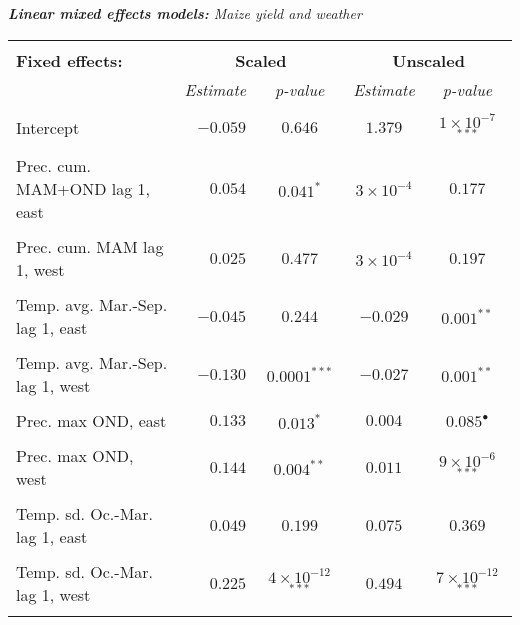 \documentclass[a4paper,12pt]{article}
\begin{document}
{\centering
\begin{threeparttable}


\singlespacing
\caption{\textit{\textbf{Linear mixed effects models:} Maize yield and weather}}
\label{Peggy45} 
\centering
\begin{small}
\begin{tabular}{lrccc} 
\hline \vspace{-0.2cm} \\
  
  
  \multicolumn{1}{l}{\vspace{0.1cm}\textbf{Fixed effects:}}  &\multicolumn{2}{c}{\textbf{Scaled}}& \multicolumn{2}{c}{{\textbf{Unscaled\tnote{a}}}} \\
  
    \multicolumn{1}{l}{\vspace{0.1cm}}  &\textit{Estimate}&\textit{p-value}&\multicolumn{1}{c}{\textit{Estimate}}& \multicolumn{1}{c}{\textit{p-value}} \\
 \hline 
\hline
\\
\vspace{-0.2cm}Intercept&$-0.059$&$0.646$&$1.379$&$1\times10^{-7}$$^{***}$\\
  \\
\vspace{-0.2cm}Prec. cum. MAM+OND lag 1, east&$0.054$&$0.041^{*}$&$3\times10^{-4}$&$0.177$\\
  \\
  \vspace{-0.2cm}Prec. cum. MAM lag 1, west&$0.025$&$0.477$&$3\times10^{-4}$&$0.197$\\
  \\
  \vspace{-0.2cm}Temp. avg. Mar.-Sep. lag 1, east&$-0.045$&$0.244$&$-0.029$&$0.001^{**}$\\
  \\
    \vspace{-0.2cm}Temp. avg. Mar.-Sep. lag 1, west&$-0.130$&$0.0001^{***}$&$-0.027$&$0.001^{**}$\\
  \\
  
      \vspace{-0.2cm}Prec. max OND, east&$0.133$&$0.013^{*}$&$0.004$&$0.085^{\bullet}$\\
  \\
        \vspace{-0.2cm}Prec. max OND, west&$0.144$&$0.004^{**}$&$0.011$&$9\times10^{-6}$$^{***}$\\
  \\
    \vspace{-0.2cm}Temp. sd. Oc.-Mar. lag 1, east&$0.049$&$0.199$&$0.075$&$0.369$\\
  \\
      Temp. sd. Oc.-Mar. lag 1, west&$0.225$& $4\times10^{-12}$ $^{***}$&$0.494$&$7\times10^{-12}$ $^{***}$\\
    \vspace{-0.1cm} \\ 
  \hline
  

\end{tabular}
\end{small}
\end{threeparttable}}
\end{document}
